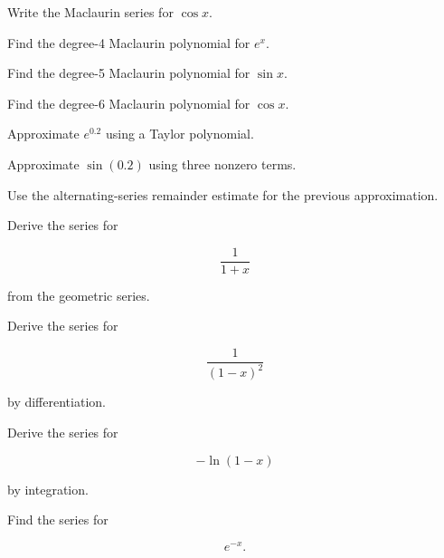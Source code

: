 \begin{exercise}[1]
Write the Maclaurin series for \(\cos x\).
\end{exercise}

\begin{exercise}[2]
Find the degree-4 Maclaurin polynomial for \(e^x\).
\end{exercise}

\begin{exercise}[2]
Find the degree-5 Maclaurin polynomial for \(\sin x\).
\end{exercise}

\begin{exercise}[2]
Find the degree-6 Maclaurin polynomial for \(\cos x\).
\end{exercise}

\begin{exercise}[2]
Approximate \(e^{0.2}\) using a Taylor polynomial.
\end{exercise}

\begin{exercise}[2]
Approximate \(\sin(0.2)\) using three nonzero terms.
\end{exercise}

\begin{exercise}[2]
Use the alternating-series remainder estimate for the previous approximation.
\end{exercise}

\begin{exercise}[2]
Derive the series for

\[
\frac{1}{1+x}
\]

from the geometric series.
\end{exercise}

\begin{exercise}[2]
Derive the series for

\[
\frac{1}{(1-x)^2}
\]

by differentiation.
\end{exercise}

\begin{exercise}[2]
Derive the series for

\[
-\ln(1-x)
\]

by integration.
\end{exercise}

\begin{exercise}[2]
Find the series for

\[
e^{-x}.
\]
\end{exercise}


